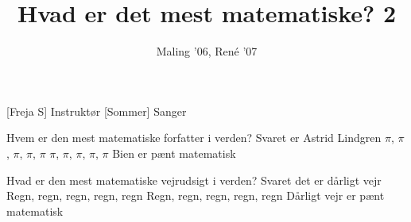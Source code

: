 \documentclass[a4paper,11pt]{article}
\title{Hvad er det mest matematiske? 2}
\author{Maling '06, René '07}
\begin{document}
\maketitle

\begin{roles}
[Freja S] Instruktør
[Sommer] Sanger
\end{roles}

\begin{song}
 Hvem er den mest matematiske forfatter i verden?
Svaret er Astrid Lindgren
$\pi$, $\pi$, $\pi$, $\pi$, $\pi$
$\pi$, $\pi$, $\pi$, $\pi$, $\pi$
Bien er pænt matematisk

 Hvad er den mest matematiske vejrudsigt i verden?
Svaret det er dårligt vejr
Regn, regn, regn, regn, regn
Regn, regn, regn, regn, regn
Dårligt vejr er pænt matematisk
\end{song}
\end{document}
